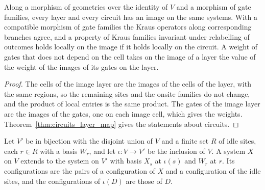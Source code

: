 \begin{theorem}
    \label{thm:circuits_map_gate}
    \leanok
    Along a morphism of geometries over the identity of $V$ and a morphism of gate
    families, every layer and every circuit has an image on the same systems. With a
    compatible morphism of gate families the Kraus operators along corresponding
    branches agree, and a property of Kraus families invariant under relabelling of
    outcomes holds locally on the image if it holds locally on the circuit. A weight
    of gates that does not depend on the cell takes on the image of a layer the value
    of the weight of the images of its gates on the layer.
\end{theorem}
\begin{proof}\leanok
    The cells of the image layer are the images of the cells of the layer, with the
    same regions, so the remaining sites and the onsite families do not change, and
    the product of local entries is the same product. The gates of the image layer
    are the images of the gates, one on each image cell, which gives the weights.
    Theorem~\ref{thm:circuits_layer_map} gives the statements about circuits.
\end{proof}

\begin{definition}
    \label{def:circuits_extend_system}
    \leanok
    Let $V'$ be in bijection with the disjoint union of $V$ and a finite set $R$ of
    idle sites, each $r\in R$ with a basis $W_r$, and let $\iota:V\to V'$ be the
    inclusion of $V$. A system $X$ on $V$ extends to the system on $V'$ with basis
    $X_s$ at $\iota(s)$ and $W_r$ at $r$. Its configurations are the pairs of a
    configuration of $X$ and a configuration of the idle sites, and the
    configurations of $\iota(D)$ are those of $D$.
\end{definition}


